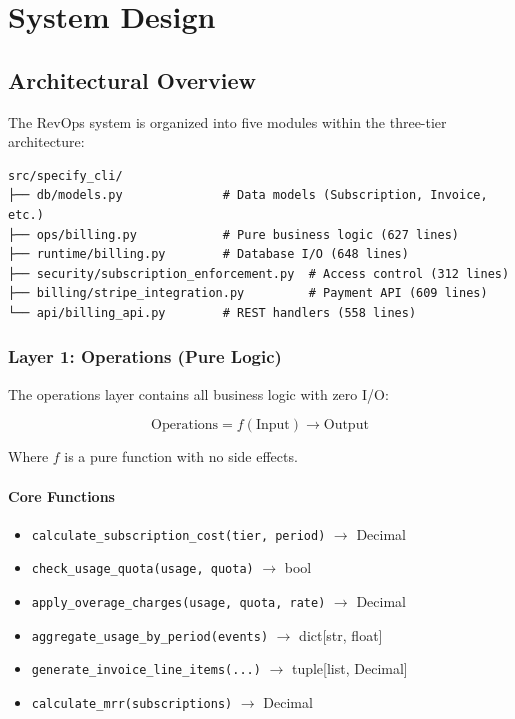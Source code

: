 \documentclass[12pt]{report}
\begin{document}
\chapter{System Design}

\section{Architectural Overview}

The RevOps system is organized into five modules within the three-tier architecture:

\begin{lstlisting}
src/specify_cli/
├── db/models.py              # Data models (Subscription, Invoice, etc.)
├── ops/billing.py            # Pure business logic (627 lines)
├── runtime/billing.py        # Database I/O (648 lines)
├── security/subscription_enforcement.py  # Access control (312 lines)
├── billing/stripe_integration.py         # Payment API (609 lines)
└── api/billing_api.py        # REST handlers (558 lines)
\end{lstlisting}

\subsection{Layer 1: Operations (Pure Logic)}

The operations layer contains all business logic with zero I/O:

\begin{equation}
\text{Operations} = f(\text{Input}) \rightarrow \text{Output}
\end{equation}

Where $f$ is a pure function with no side effects.

\subsubsection{Core Functions}

\begin{itemize}
    \item \lstinline{calculate_subscription_cost(tier, period)} $\rightarrow$ Decimal
    \item \lstinline{check_usage_quota(usage, quota)} $\rightarrow$ bool
    \item \lstinline{apply_overage_charges(usage, quota, rate)} $\rightarrow$ Decimal
    \item \lstinline{aggregate_usage_by_period(events)} $\rightarrow$ dict[str, float]
    \item \lstinline{generate_invoice_line_items(...)} $\rightarrow$ tuple[list, Decimal]
    \item \lstinline{calculate_mrr(subscriptions)} $\rightarrow$ Decimal
\end{itemize}
\end{document}

